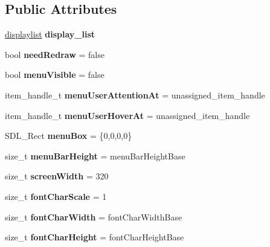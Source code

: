 \subsection*{Public Attributes}
\begin{DoxyCompactItemize}
\item 
\hypertarget{classDOSBoxMenu_ac2c38f4e2dffd87211dafa2d42a5230e}{\hyperlink{classDOSBoxMenu_1_1displaylist}{displaylist} {\bfseries display\-\_\-list}}\label{classDOSBoxMenu_ac2c38f4e2dffd87211dafa2d42a5230e}

\item 
\hypertarget{classDOSBoxMenu_ae649bc277ce09d96bda55f16bdf05fd8}{bool {\bfseries need\-Redraw} = false}\label{classDOSBoxMenu_ae649bc277ce09d96bda55f16bdf05fd8}

\item 
\hypertarget{classDOSBoxMenu_a3fde7a3e9bc708d1e53b6adbe3130c5c}{bool {\bfseries menu\-Visible} = false}\label{classDOSBoxMenu_a3fde7a3e9bc708d1e53b6adbe3130c5c}

\item 
\hypertarget{classDOSBoxMenu_adf17c446d1d90dd667a967c5a126ab87}{item\-\_\-handle\-\_\-t {\bfseries menu\-User\-Attention\-At} = unassigned\-\_\-item\-\_\-handle}\label{classDOSBoxMenu_adf17c446d1d90dd667a967c5a126ab87}

\item 
\hypertarget{classDOSBoxMenu_ad89744fd8a092b86226fa22a3159a5b3}{item\-\_\-handle\-\_\-t {\bfseries menu\-User\-Hover\-At} = unassigned\-\_\-item\-\_\-handle}\label{classDOSBoxMenu_ad89744fd8a092b86226fa22a3159a5b3}

\item 
\hypertarget{classDOSBoxMenu_ab42d2a5d630ccaf58e17eb2cb77c87d8}{S\-D\-L\-\_\-\-Rect {\bfseries menu\-Box} = \{0,0,0,0\}}\label{classDOSBoxMenu_ab42d2a5d630ccaf58e17eb2cb77c87d8}

\item 
\hypertarget{classDOSBoxMenu_a4355c3f8b8295d1c23ff3c69da8a3195}{size\-\_\-t {\bfseries menu\-Bar\-Height} = menu\-Bar\-Height\-Base}\label{classDOSBoxMenu_a4355c3f8b8295d1c23ff3c69da8a3195}

\item 
\hypertarget{classDOSBoxMenu_af582488f184003eb0536033e930f757c}{size\-\_\-t {\bfseries screen\-Width} = 320}\label{classDOSBoxMenu_af582488f184003eb0536033e930f757c}

\item 
\hypertarget{classDOSBoxMenu_a2bf601ce1453eac218d6232a314f9315}{size\-\_\-t {\bfseries font\-Char\-Scale} = 1}\label{classDOSBoxMenu_a2bf601ce1453eac218d6232a314f9315}

\item 
\hypertarget{classDOSBoxMenu_a91a5522a383f58b92ef70b1293cffbf1}{size\-\_\-t {\bfseries font\-Char\-Width} = font\-Char\-Width\-Base}\label{classDOSBoxMenu_a91a5522a383f58b92ef70b1293cffbf1}

\item 
\hypertarget{classDOSBoxMenu_ac88803de70c5f4a476af4da1899f79eb}{size\-\_\-t {\bfseries font\-Char\-Height} = font\-Char\-Height\-Base}\label{classDOSBoxMenu_ac88803de70c5f4a476af4da1899f79eb}

\end{DoxyCompactItemize}
